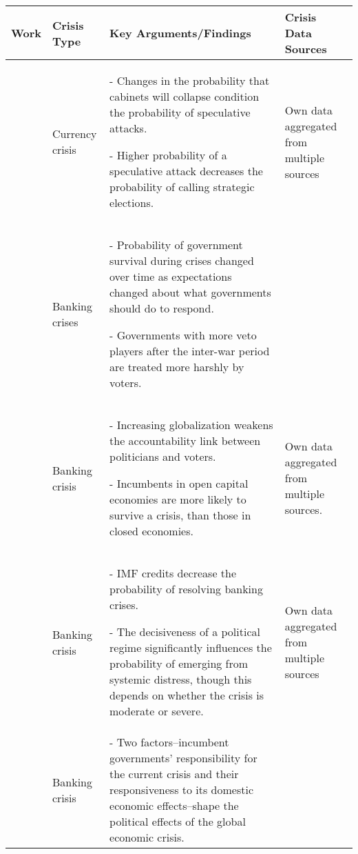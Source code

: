 \begin{tabular}{ m{2.5cm} m{1.75cm} m{6.25cm} m{2.5cm} }
    \hline
    Work & Crisis Type & Key Arguments/Findings & Crisis Data Sources \\
    \hline\hline

    \cite{Bernhard2008} & Currency crisis & - Changes in the probability that cabinets will collapse condition the probability of speculative attacks.

    - Higher probability of a speculative attack decreases the probability of calling strategic elections. & Own data aggregated from multiple sources \\[0.25cm]\hline

    \cite{Chwieroth2013} & Banking crises &  - Probability of government survival during crises changed over time as expectations changed about what governments should do to respond.

    - Governments with more veto players after the inter-war period are treated more harshly by voters. & \cite{ReinhartRog2010} \\[0.25cm]\hline

    \cite{CrespoTenorio2014} & Banking crisis & - Increasing globalization weakens the accountability link between politicians and voters.

    - Incumbents in open capital economies are more likely to survive a crisis, than those in closed economies. & Own data aggregated from multiple sources. \\[0.25cm]\hline

    \cite{Montinola2003} & Banking crisis & - IMF credits decrease the probability of resolving banking crises.

    - The decisiveness of a political regime significantly influences the probability of emerging from systemic distress, though this depends on whether the crisis is moderate or severe. & Own data aggregated from multiple sources \\[0.25cm]\hline

    \cite{Pepinsky2012} & Banking crisis & - Two factors--incumbent governments' responsibility for the current crisis and their responsiveness to its domestic economic effects--shape the political effects of the global economic crisis. & \cite{Laeven2010} \\[0.25cm]\hline

    \hline
\end{tabular}
